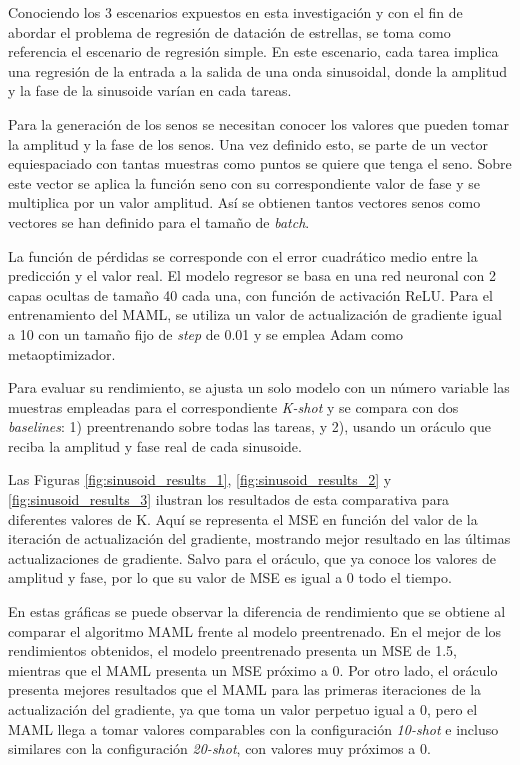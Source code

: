 Conociendo los 3 escenarios expuestos en esta investigación y con el fin de abordar el problema de regresión de datación de estrellas, se toma como referencia el escenario de regresión simple. En este escenario, cada tarea implica una regresión de la entrada a la salida de una onda sinusoidal, donde la amplitud y la fase de la sinusoide varían en cada tareas.

Para la generación de los senos se necesitan conocer los valores que pueden tomar la amplitud y la fase de los senos. Una vez definido esto, se parte de un vector equiespaciado con tantas muestras como puntos se quiere que tenga el seno. Sobre este vector se aplica la función seno con su correspondiente valor de fase y se multiplica por un valor amplitud. Así se obtienen tantos vectores senos como vectores se han definido para el tamaño de \emph{batch}.%

La función de pérdidas se corresponde con el error cuadrático medio entre la predicción y el valor real. El modelo regresor se basa en una red neuronal con 2 capas ocultas de tamaño 40 cada una, con función de activación ReLU. Para el entrenamiento del MAML, se utiliza un valor de actualización de gradiente igual a 10 con un tamaño fijo de \emph{step} de 0.01 y se emplea Adam como metaoptimizador.


Para evaluar su rendimiento, se ajusta un solo modelo con un número variable las muestras empleadas para el correspondiente \emph{K-shot} y se compara con dos \emph{baselines}: 1) preentrenando sobre todas las tareas, y 2), usando un oráculo que reciba la amplitud y fase real de cada sinusoide.

Las Figuras \ref{fig:sinusoid_results_1}, \ref{fig:sinusoid_results_2} y \ref{fig:sinusoid_results_3} ilustran los resultados de esta comparativa para diferentes valores de K. Aquí se representa el MSE en función del valor de la iteración de actualización del gradiente, mostrando mejor resultado en las últimas actualizaciones de gradiente. Salvo para el oráculo, que ya conoce los valores de amplitud y fase, por lo que su valor de MSE es igual a 0 todo el tiempo.

En estas gráficas se puede observar la diferencia de rendimiento que se obtiene al comparar el algoritmo MAML frente al modelo preentrenado. En el mejor de los rendimientos obtenidos, el modelo preentrenado presenta un MSE de 1.5, mientras que el MAML presenta un MSE próximo a 0. Por otro lado, el oráculo presenta mejores resultados que el MAML para las primeras iteraciones de la actualización del gradiente, ya que toma un valor perpetuo igual a 0, pero el MAML llega a tomar valores comparables con la configuración \emph{10-shot} e incluso similares con la configuración \emph{20-shot}, con valores muy próximos a 0.


